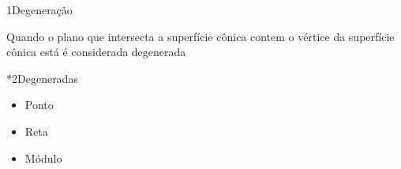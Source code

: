 \documentclass["./AM_2C-Anotacoes.tex"]{subfiles}
\begin{document}
\begin{sectionBox}1{Degeneração}

  Quando o plano que intersecta a superfície cônica contem o vértice da superfície cônica está é considerada degenerada

  \begin{multicols}{2}

    \begin{sectionBox}*2{Degeneradas}
      \begin{itemize}
        \item Ponto
        \item Reta
        \item Módulo
      \end{itemize}


\end{sectionBox}
\end{multicols}
\end{sectionBox}
\end{document}
